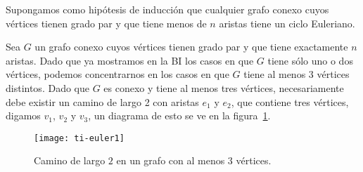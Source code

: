 \begin{teorema}
\begin{demostracion}
\begin{inducciondemo}
  \HI Supongamos como hipótesis de inducción que cualquier grafo conexo cuyos vértices tienen grado par y que tiene menos de $n$ aristas tiene un ciclo Euleriano.
  
  \TI Sea $G$ un grafo conexo cuyos vértices tienen grado par y que tiene exactamente $n$ aristas. 
  Dado que ya mostramos en la BI los casos en que $G$ tiene sólo uno o dos vértices, podemos concentrarnos en los casos en que $G$ tiene al menos $3$ vértices distintos.
  Dado que $G$ es conexo y tiene al menos tres vértices, necesariamente debe existir un camino de largo 2 con aristas $e_1$ y $e_2$, que contiene tres vértices, digamos $v_1$, $v_2$ y $v_3$, un diagrama de esto se ve en la figura~\ref{fig:ti-euler1}.
  
  \begin{figure}[h!]
  \centering
  \texttt{[image: ti-euler1]}
  \caption{Camino de largo $2$ en un grafo con al menos $3$ vértices.}
  \label{fig:ti-euler1}
  \end{figure}
  

\end{inducciondemo}
\end{demostracion}
\end{teorema}

